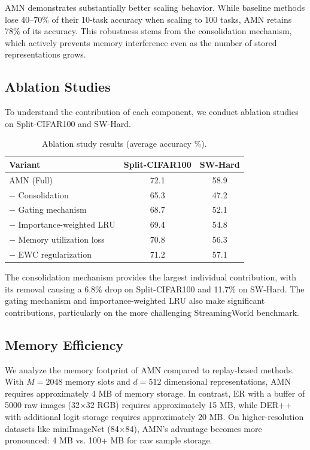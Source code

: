 \documentclass[11pt]{article}
\begin{document}
AMN demonstrates substantially better scaling behavior. While baseline methods lose 40--70\% of their 10-task accuracy when scaling to 100 tasks, AMN retains 78\% of its accuracy. This robustness stems from the consolidation mechanism, which actively prevents memory interference even as the number of stored representations grows.

\subsection{Ablation Studies}

To understand the contribution of each component, we conduct ablation studies on Split-CIFAR100 and SW-Hard.

\begin{table}[h]
\centering
\caption{Ablation study results (average accuracy \%).}
\label{tab:ablation}
\begin{tabular}{lcc}
\hline
Variant & Split-CIFAR100 & SW-Hard \\
\hline
AMN (Full) & 72.1 & 58.9 \\
$-$ Consolidation & 65.3 & 47.2 \\
$-$ Gating mechanism & 68.7 & 52.1 \\
$-$ Importance-weighted LRU & 69.4 & 54.8 \\
$-$ Memory utilization loss & 70.8 & 56.3 \\
$-$ EWC regularization & 71.2 & 57.1 \\
\hline
\end{tabular}
\end{table}

The consolidation mechanism provides the largest individual contribution, with its removal causing a 6.8\% drop on Split-CIFAR100 and 11.7\% on SW-Hard. The gating mechanism and importance-weighted LRU also make significant contributions, particularly on the more challenging StreamingWorld benchmark.

\subsection{Memory Efficiency}

We analyze the memory footprint of AMN compared to replay-based methods. With $M = 2048$ memory slots and $d = 512$ dimensional representations, AMN requires approximately 4 MB of memory storage. In contrast, ER with a buffer of 5000 raw images (32$\times$32 RGB) requires approximately 15 MB, while DER++ with additional logit storage requires approximately 20 MB. On higher-resolution datasets like miniImageNet (84$\times$84), AMN's advantage becomes more pronounced: 4 MB vs. 100+ MB for raw sample storage.
\end{document}
